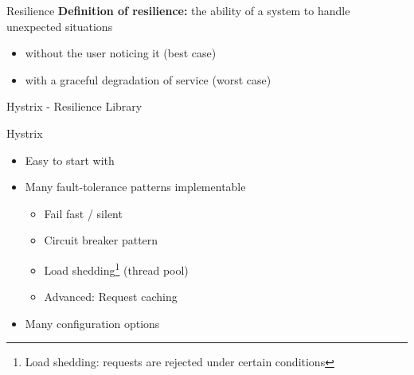 \begin{frame}{Resilience}
\textbf{Definition of resilience:}
\newline
the ability of a system to handle unexpected situations 
\begin{itemize}
	\item without the user noticing it (best case)
	\item with a graceful degradation of service (worst case)
\end{itemize}
\vfill
{}
\end{frame}

\begin{frame}{Hystrix - Resilience Library}

\begin{block}{Hystrix}
\vspace{-2mm}
\begin{itemize}
\item Easy to start with
\item Many fault-tolerance patterns implementable
	\begin{itemize}
	\item Fail fast / silent 
	\item Circuit breaker pattern
	\item Load shedding\footnote{Load shedding: requests are rejected under certain conditions} (thread pool)
	\item Advanced: Request caching
	\end{itemize}
\item Many configuration options
\end{itemize}
\vspace{-2mm}
\end{block}
\vspace{-2mm}

\end{frame}

